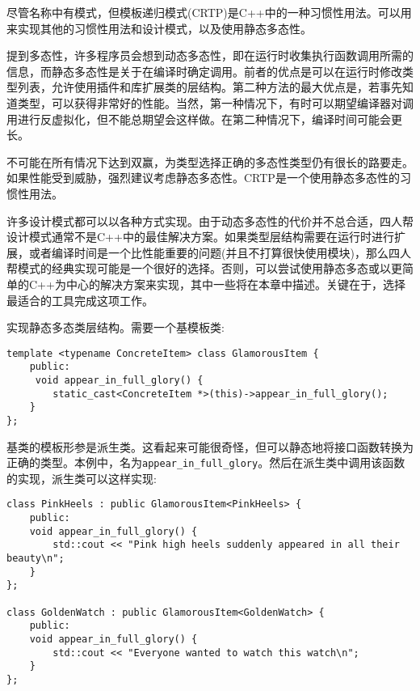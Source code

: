 
尽管名称中有模式，但模板递归模式(CRTP)是C++中的一种习惯性用法。可以用来实现其他的习惯性用法和设计模式，以及使用静态多态性。


提到多态性，许多程序员会想到动态多态性，即在运行时收集执行函数调用所需的信息，而静态多态性是关于在编译时确定调用。前者的优点是可以在运行时修改类型列表，允许使用插件和库扩展类的层结构。第二种方法的最大优点是，若事先知道类型，可以获得非常好的性能。当然，第一种情况下，有时可以期望编译器对调用进行反虚拟化，但不能总期望会这样做。在第二种情况下，编译时间可能会更长。

不可能在所有情况下达到双赢，为类型选择正确的多态性类型仍有很长的路要走。如果性能受到威胁，强烈建议考虑静态多态性。CRTP是一个使用静态多态性的习惯性用法。

许多设计模式都可以以各种方式实现。由于动态多态性的代价并不总合适，四人帮设计模式通常不是C++中的最佳解决方案。如果类型层结构需要在运行时进行扩展，或者编译时间是一个比性能重要的问题(并且不打算很快使用模块)，那么四人帮模式的经典实现可能是一个很好的选择。否则，可以尝试使用静态多态或以更简单的C++为中心的解决方案来实现，其中一些将在本章中描述。关键在于，选择最适合的工具完成这项工作。


实现静态多态类层结构。需要一个基模板类:

\begin{lstlisting}[style=styleCXX]
template <typename ConcreteItem> class GlamorousItem {
	public:
	 void appear_in_full_glory() {
		static_cast<ConcreteItem *>(this)->appear_in_full_glory();
	}
};
\end{lstlisting}

基类的模板形参是派生类。这看起来可能很奇怪，但可以静态地将接口函数转换为正确的类型。本例中，名为\texttt{appear\_in\_full\_glory}。然后在派生类中调用该函数的实现，派生类可以这样实现:

\begin{lstlisting}[style=styleCXX]
class PinkHeels : public GlamorousItem<PinkHeels> {
	public:
	void appear_in_full_glory() {
		std::cout << "Pink high heels suddenly appeared in all their beauty\n";
	}
};

class GoldenWatch : public GlamorousItem<GoldenWatch> {
	public:
	void appear_in_full_glory() {
		std::cout << "Everyone wanted to watch this watch\n";
	}
};
\end{lstlisting}

